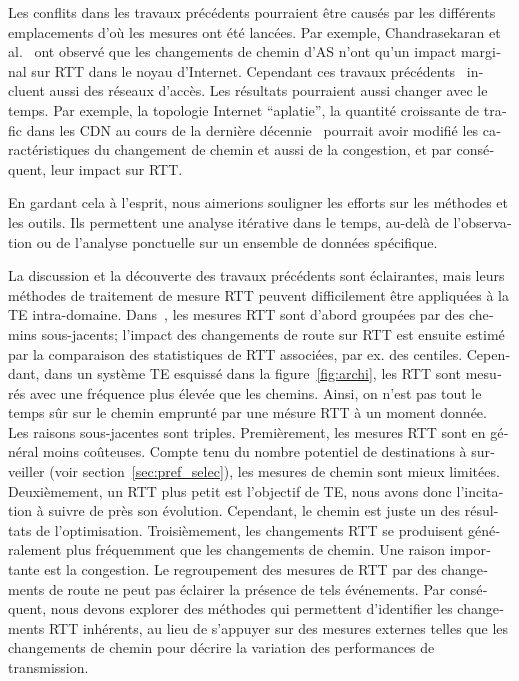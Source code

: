 \begin{otherlanguage}{french}
Les conflits dans les travaux précédents pourraient être causés par les différents emplacements d'où les mesures ont été lancées.
Par exemple, Chandrasekaran et al.~\cite{Chandrasekaran} ont observé que les changements de chemin d'AS 
n'ont qu'un impact marginal sur RTT dans le noyau d'Internet. 
Cependant ces travaux précédents~\cite{Pucha2007, Schwartz2010} incluent aussi des réseaux d'accès.
Les résultats pourraient aussi changer avec le temps. 
Par exemple, la topologie Internet ``aplatie'', la quantité croissante de trafic dans les CDN au cours de la dernière décennie~\cite{Labovitz2011, Roughan2011}
pourrait avoir modifié les caractéristiques du changement de chemin et aussi de la congestion, et par conséquent, leur impact sur RTT.

En gardant cela à l'esprit, nous aimerions souligner les efforts sur les méthodes et les outils.
Ils permettent une analyse itérative dans le temps, 
au-delà de l'observation ou de l'analyse ponctuelle sur un ensemble de données spécifique.

La discussion et la découverte des travaux précédents sont éclairantes, 
mais leurs méthodes de traitement de mesure RTT peuvent difficilement être appliquées à la TE intra-domaine.
Dans~\cite{Pucha2007, Schwartz2010, Chandrasekaran},
les mesures RTT sont d'abord groupées par des chemins sous-jacents;
l'impact des changements de route sur RTT est ensuite estimé par la comparaison des statistiques de RTT associées, par ex. des centiles.
Cependant, dans un système TE  esquissé dans la figure~\ref{fig:archi}, 
les RTT sont mesurés avec une fréquence plus élevée que les chemins.
Ainsi, on n'est pas tout le temps sûr sur le chemin emprunté par une mésure RTT à un moment donnée. 
Les raisons sous-jacentes sont triples.
Premièrement, les mesures RTT sont en général moins coûteuses.
Compte tenu du nombre potentiel de destinations à surveiller (voir section~\ref {sec:pref_selec}), 
les mesures de chemin sont mieux limitées.
Deuxièmement, un RTT plus petit est l'objectif de TE, nous avons donc l'incitation à suivre de près son évolution. 
Cependant, le chemin est juste un des résultats de l'optimisation.
Troisièmement, les changements RTT se produisent généralement plus fréquemment que les changements de chemin.
Une raison importante est la congestion.
Le regroupement des mesures de RTT par des changements de route ne peut pas éclairer la présence de tels événements.
Par conséquent, nous devons explorer des méthodes qui permettent d'identifier les changements RTT inhérents, 
au lieu de s'appuyer sur des mesures externes telles que les changements de chemin pour décrire la variation des performances de transmission.


\end{otherlanguage}
